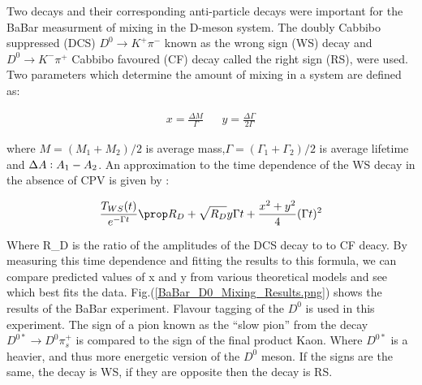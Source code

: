 Two decays and their corresponding anti-particle decays were important for the BaBar measurment of mixing in the D-meson system. The doubly Cabbibo suppressed (DCS) $D^{0} \rightarrow K^{+} \pi^{-}$ known as the wrong sign (WS) decay and $D^{0} \rightarrow K^{-} \pi^{+}$ Cabbibo favoured (CF) decay called the right sign (RS), were used. Two parameters which determine the amount of mixing in a system are defined as:

\begin{align*}
x = \frac{\Delta M}{\Gamma} & & y = \frac{\Delta \Gamma}{2 \Gamma}
\end{align*}

\noindent where $M= (M_{1}+M_{2})/2$ is average mass,$\Gamma = (\Gamma_{1}+\Gamma_{2})/2$ is average lifetime and $\Delta A \vcentcolon A_{1} - A_{2}$. An approximation to the time dependence of the WS decay in the absence of CPV is given by \cite{BabarD0mixing}:

\begin{equation*}
\frac{T_{WS}(t)}{e^{-\Gamma t}} \prop R_{D} + \sqrt{R_{D}} y \Gamma t + \frac{x^2 + y^2}{4} (\Gamma t)^{2}
\end{equation*}

\noindent Where R_{D} is the ratio of the amplitudes of the DCS decay to to CF deacy. By measuring this time dependence and fitting the results to this formula, we can compare predicted values of x and y from various theoretical models and see which best fits the data. Fig.(\ref{BaBar_D0_Mixing_Results.png}) shows the results of the BaBar experiment. Flavour tagging of the $D^{0}$ is used in this experiment. The sign of a pion known as the ``slow pion'' from the decay $D^{0*} \rightarrow D^{0} \pi^{+}_{s}$ is compared to the sign of the final product Kaon. Where $D^{0*}$ is a heavier, and thus more energetic version of the $D^{0}$ meson. If the signs are the same, the decay is WS, if they are opposite then the decay is RS.          

